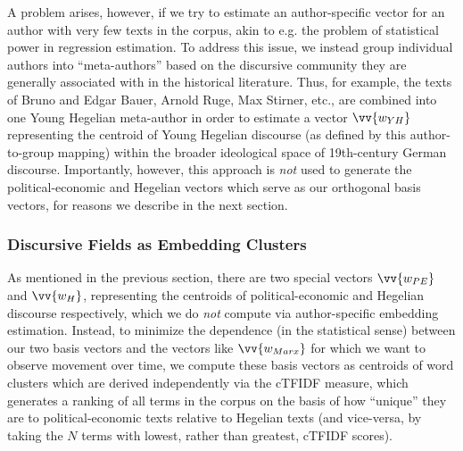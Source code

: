 A problem arises, however, if we try to estimate an author-specific vector for an author with very few texts in the corpus, akin to e.g. the problem of statistical power in regression estimation. To address this issue, we instead group individual authors into ``meta-authors'' based on the discursive community they are generally associated with in the historical literature. Thus, for example, the texts of Bruno and Edgar Bauer, Arnold Ruge, Max Stirner, etc., are combined into one Young Hegelian meta-author in order to estimate a vector $\vv{w_{YH}}$ representing the centroid of Young Hegelian discourse (as defined by this author-to-group mapping) within the broader ideological space of 19th-century German discourse. Importantly, however, this approach is \textit{not} used to generate the political-economic and Hegelian vectors which serve as our orthogonal basis vectors, for reasons we describe in the next section.


\subsubsection{Discursive Fields as Embedding Clusters}

As mentioned in the previous section, there are two special vectors $\vv{w_{PE}}$ and $\vv{w_H}$, representing the centroids of political-economic and Hegelian discourse respectively, which we do \textit{not} compute via author-specific embedding estimation. Instead, to minimize the dependence (in the statistical sense) between our two basis vectors and the vectors like $\vv{w_{Marx}}$ for which we want to observe movement over time, we compute these basis vectors as centroids of word clusters which are derived independently via the cTFIDF measure, which generates a ranking of all terms in the corpus on the basis of how ``unique'' they are to political-economic texts relative to Hegelian texts (and vice-versa, by taking the $N$ terms with lowest, rather than greatest, cTFIDF scores).
